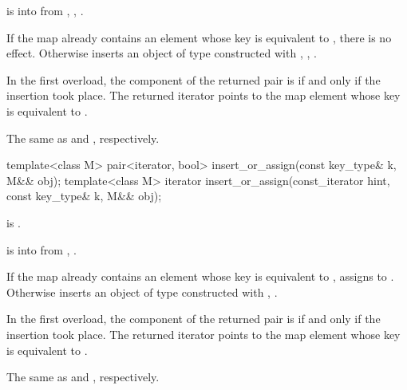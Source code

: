 \begin{itemdescr}
\pnum
\expects
{} is  into 
from , ,
.

\pnum
\effects
If the map already contains an element
whose key is equivalent to ,
there is no effect.
Otherwise inserts an object of type 
constructed with , ,
.

\pnum
\returns
In the first overload,
the  component of the returned pair is 
if and only if the insertion took place.
The returned iterator points to the map element
whose key is equivalent to .

\pnum
\complexity
The same as  and ,
respectively.
\end{itemdescr}

%
\begin{itemdecl}
template<class M>
  pair<iterator, bool> insert_or_assign(const key_type& k, M&& obj);
template<class M>
  iterator insert_or_assign(const_iterator hint, const key_type& k, M&& obj);
\end{itemdecl}

\begin{itemdescr}
\pnum
\mandates
{} is .

\pnum
\expects
{} is  into 
from , .

\pnum
\effects
If the map already contains an element 
whose key is equivalent to ,
assigns  to .
Otherwise inserts an object of type 
constructed with , .

\pnum
\returns
In the first overload,
the  component of the returned pair is 
if and only if the insertion took place.
The returned iterator points to the map element
whose key is equivalent to .

\pnum
\complexity
The same as  and ,
respectively.
\end{itemdescr}

